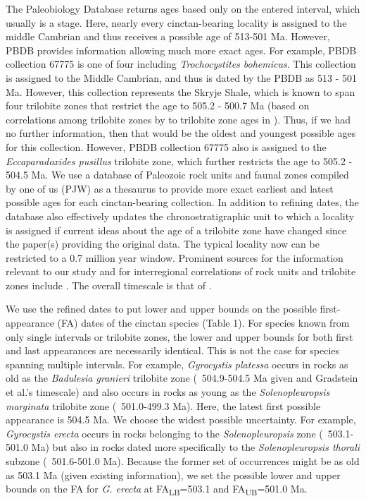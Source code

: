 \documentclass{article}
\begin{document}
The Paleobiology Database returns ages based only on the entered interval, which usually is a stage. Here, nearly every cinctan-bearing locality is assigned to the middle Cambrian and thus receives a possible age of 513-501 Ma. However, PBDB provides information allowing much more exact ages. For example, PBDB collection 67775 is one of four including \textit{Trochocystites bohemicus}. This collection is assigned to the Middle Cambrian, and thus is dated by the PBDB as 513 - 501 Ma. However, this collection represents the Skryje Shale, which is known to span four trilobite zones that restrict the age to 505.2 - 500.7 Ma (based on correlations among trilobite zones by \citealp{Geyer2019} to trilobite zone ages in \citealp{Gradstein2012}). Thus, if we had no further information, then that would be the oldest and youngest possible ages for this collection. However, PBDB collection 67775 also is assigned to the \textit{Eccaparadoxides pusillus} trilobite zone, which further restricts the age to 505.2 - 504.5 Ma. We use a database of Paleozoic rock units and faunal zones compiled by one of us (PJW) as a thesaurus to provide more exact earliest and latest possible ages for each cinctan-bearing collection. In addition to refining dates, the database also effectively updates the chronostratigraphic unit to which a locality is assigned if current ideas about the age of a trilobite zone have changed since the paper(s) providing the original data. The typical locality now can be restricted to a 0.7 million year window. Prominent sources for the information relevant to our study and for interregional correlations of rock units and trilobite zones include \cite{Alvaro2001, Linan2004, Geyer2006, Geyer2000, Alvaro2007, Geyer2019}.  The overall timescale is that of \cite{Gradstein2012}. 

We use the refined dates to put lower and upper bounds on the possible first-appearance (FA) dates of the cinctan species (Table 1). For species known from only single intervals or trilobite zones, the lower and upper bounds for both first and last appearances are necessarily identical. This is not the case for species spanning multiple intervals. For example, \textit{Gyrocystis platessa} occurs in rocks as old as the \textit{Badulesia granieri} trilobite zone (~504.9-504.5 Ma given \cite{Geyer2019} and Gradstein et al.’s timescale) and also occurs in rocks as young as the \textit{Solenopleuropsis marginata} trilobite zone (~501.0-499.3 Ma).  Here, the latest first possible appearance is 504.5 Ma. We choose the widest possible uncertainty. For example, \textit{Gyrocystis erecta} occurs in rocks belonging to the \textit{Solenopleuropsis} zone (~503.1-501.0 Ma) but also in rocks dated more specifically to the \textit{Solenopleuropsis thorali} subzone (~501.6-501.0 Ma). Because the former set of occurrences might be as old as 503.1 Ma (given existing information), we set the possible lower and upper bounds on the FA for \textit{G. erecta} at FA\textsubscript{LB}=503.1 and FA\textsubscript{UB}=501.0 Ma.
\end{document}
